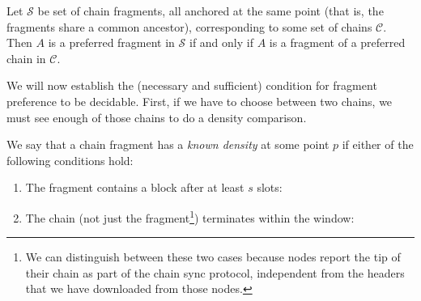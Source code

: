 \begin{definition}
Let $\mathcal{S}$ be set of chain fragments, all anchored at the same point
(that is, the fragments share a common ancestor), corresponding to some set of
chains $\mathcal{C}$. Then $A$ is a preferred fragment in $\mathcal{S}$ if and
only if $A$ is a fragment of a preferred chain in $\mathcal{C}$.
\end{definition}

We will now establish the (necessary and sufficient) condition for fragment
preference to be decidable. First, if we have to choose between two chains, we
must see enough of those chains to do a density comparison.

\pagebreak

\begin{definition}
We say that a chain fragment has a \emph{known density} at some point $p$
if either of the following conditions hold:

\begin{enumerate}
\item The fragment contains a block after at least $s$ slots:
\begin{center}
\end{center}

\item The chain (not just the fragment\footnote{We can distinguish between these
two cases because nodes report the tip of their chain as part of the chain sync
protocol, independent from the headers that we have downloaded from those
nodes.}) terminates within the window:
\begin{center}
\end{center}
\end{enumerate}
\end{definition}

